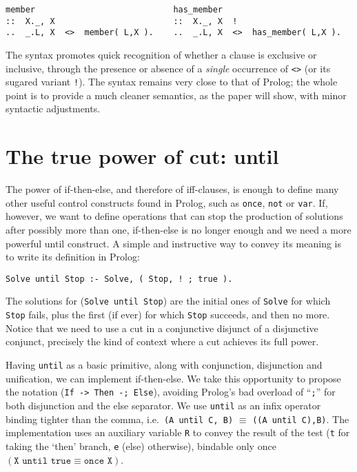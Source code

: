 \documentclass{tlp}
\begin{document}
\vspace{-3.7pt}
\begin{verbatim}
member                            has_member
::  X._, X                        ::  X._, X  !
..  _.L, X  <>  member( L,X ).    ..  _.L, X  <>  has_member( L,X ).
\end{verbatim}
\vspace{-3.7pt} The syntax promotes quick recognition of whether a clause is
exclusive or inclusive, through the presence or absence of a \emph{single}
occurrence of \texttt{<>} (or its
sugared variant
\texttt{!}). The syntax remains very close to that of Prolog; the whole point is
to provide a much cleaner semantics, as the paper will show, with minor syntactic
adjustments.

\section{The true power of cut: \textsf{until}}
\label{sec:until}

The power of \textsf{if-then-else}, and therefore of iff-clauses, is enough to define many other useful
control constructs found in Prolog, such as \texttt{once}, \texttt{not}
or \texttt{var}. If, however, we want to define operations that can stop the production of
solutions after possibly more than one, \textsf{if-then-else} is no
longer enough and we need a more powerful \textsf{until} construct. A
simple and instructive way to convey its meaning is to write its
definition in Prolog:

\vspace{-3.7pt}
\begin{verbatim}
Solve until Stop :- Solve, ( Stop, ! ; true ).
\end{verbatim}
\vspace{-3.7pt}
The solutions for (\texttt{Solve until Stop}) are the initial ones of \verb+Solve+ for
which \verb+Stop+ fails, plus
the first (if ever) for which \verb+Stop+ succeeds, and then no more. Notice
that we need to use a cut in a conjunctive disjunct of a disjunctive conjunct,
precisely the kind of context where a cut achieves its full power.

Having \texttt{until} as a basic primitive, along with conjunction,
disjunction and unification, we can implement \textsf{if-then-else}. We take this
opportunity to propose the notation (\texttt{If -> Then -; Else}), avoiding
Prolog's bad overload of ``\verb+;+'' for both disjunction and the
\textsf{else} separator. We use \texttt{until} as an infix operator binding
tighter than the comma, i.e.\ \texttt{(A until C, B)} $\equiv$ \texttt{((A until
  C),B)}. The implementation uses an auxiliary variable \texttt{R} to
convey the result of the test (\texttt{t} for taking the
`\textsf{then}' branch, \texttt{e} (\textsf{else}) otherwise), bindable only once
$( \texttt{X until true}\equiv\texttt{once X})$.
\end{document}
